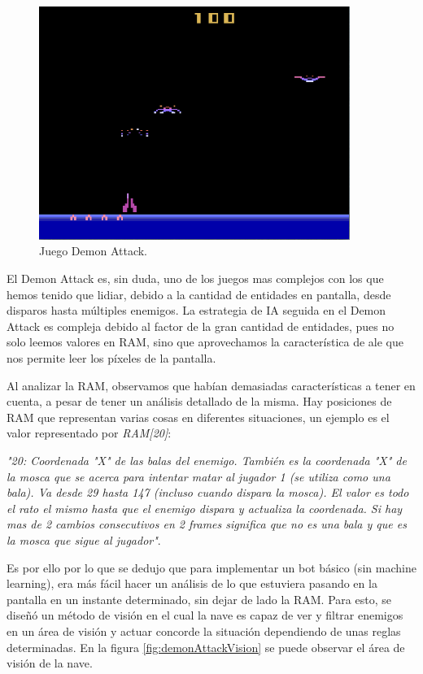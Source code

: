 \begin{figure}[h]
	\centering
	\includegraphics[width=0.9\textwidth]{Figures/demonAttackOne}
	\caption{Juego Demon Attack.}
	\label{fig:demonattackone}
\end{figure}

El Demon Attack es, sin duda, uno de los juegos mas complejos con los que hemos tenido que lidiar, debido a la cantidad de entidades en pantalla, desde disparos hasta múltiples enemigos. La estrategia de IA seguida en el Demon Attack es compleja debido al factor de la gran cantidad de entidades, pues no solo leemos valores en RAM, sino que aprovechamos la característica de \ac{ale} que nos permite leer los píxeles de la pantalla.

Al analizar la RAM, observamos que habían demasiadas características a tener en cuenta, a pesar de tener un análisis detallado de la misma. Hay posiciones de RAM que representan varias cosas en diferentes situaciones, un ejemplo es el valor representado por \textit{RAM[20]}: 

\textit{"20: Coordenada "X" de las balas del enemigo. También es la coordenada "X" de la mosca que se acerca para intentar matar al jugador 1 (se utiliza como una bala). Va desde 29 hasta 147 (incluso cuando dispara la mosca). El valor es todo el rato el mismo hasta que el enemigo dispara y actualiza la coordenada. Si hay mas de 2 cambios consecutivos en 2 frames significa que no es una bala y que es la mosca que sigue al jugador"}.

Es por ello por lo que se dedujo que para implementar un bot básico (sin machine learning), era más fácil hacer un análisis de lo que estuviera pasando en la pantalla en un instante determinado, sin dejar de lado la RAM. Para esto, se diseñó un método de visión en el cual la nave es capaz de ver y filtrar enemigos en un área de visión y actuar concorde la situación dependiendo de unas reglas determinadas. En la figura \ref{fig:demonAttackVision} se puede observar el área de visión de la nave.


